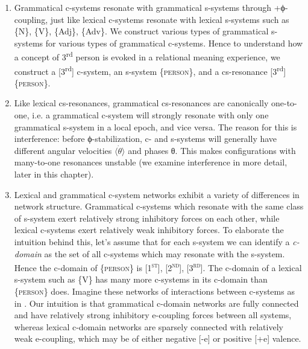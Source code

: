 \begin{enumerate}

\item Grammatical c-systems resonate with grammatical s-systems through +ϕ-coupling, just like lexical c-systems resonate with lexical s-systems such as \{N\}, \{V\}, \{Adj\}, \{Adv\}. We construct various types of grammatical s-systems for various types of grammatical c-systems. Hence to understand how a concept of 3\textsuperscript{rd} person is evoked in a relational meaning experience, we construct a [3\textsuperscript{rd}] c-system, an s-system \{\textsc{person}\}, and a cs-resonance [3\textsuperscript{rd}]\{\textsc{person}\}. 

\item Like lexical cs-resonances, grammatical cs-resonances are canonically one-to-one, i.e. a grammatical c-system will strongly resonate with only one grammatical s-system in a local epoch, and vice versa. The reason for this is interference: before ϕ-stabilization, c- and s-systems will generally have different angular velocities $\langle\dot{\theta}\rangle$ and phases θ. This makes configurations with many-to-one resonances unstable (we examine interference in more detail, later in this chapter).

\item Lexical and grammatical c-system networks exhibit a variety of differences in network structure. Grammatical c-systems which resonate with the same class of s-system exert relatively strong inhibitory forces on each other, while lexical c-systems exert relatively weak inhibitory forces. To elaborate the intuition behind this, let's assume that for each s-system we can identify a \textit{c-domain} as the set of all c-systems which may resonate with the s-system. Hence the c-domain of \{\textsc{person}\} is [1\textsc{\textsuperscript{st}}], [2\textsc{\textsuperscript{nd}}], [3\textsc{\textsuperscript{rd}}]. The c-domain of a lexical s-system such as \{V\} has many more c-systems in its c-domain than \{\textsc{person}\} does. Imagine these networks of interactions between c-systems as in {}. Our intuition is that grammatical c-domain networks are fully connected and have relatively strong inhibitory e-coupling forces between all systems, whereas lexical c-domain networks are sparsely connected with relatively weak e-coupling, which may be of either negative [-e] or positive [+e] valence.


\end{enumerate}
